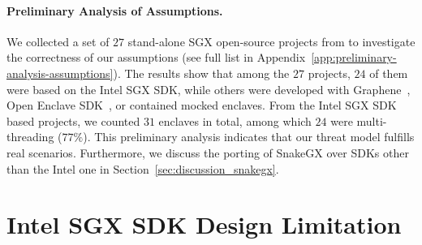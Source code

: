 \paragraph{Preliminary Analysis of Assumptions.}
We collected a set of $27$ stand-alone SGX open-source projects from 
\cite{asop} to investigate the correctness of our assumptions (see full 
list in Appendix~\ref{app:preliminary-analysis-assumptions}).
The results show that among the $27$ projects, $24$ of them were based on the 
Intel SGX SDK, while others were developed with Graphene~\citep{203255}, Open 
Enclave SDK~\citep{openenclave}, or contained mocked enclaves.
From the Intel SGX SDK based projects, we counted $31$ enclaves in total, 
among which $24$ were multi-threading ($77\%$).
This preliminary analysis indicates that our threat model fulfills 
real scenarios.
Furthermore, we discuss the porting of SnakeGX over SDKs other than the Intel 
one in Section~\ref{sec:discussion_snakegx}.

\section{Intel SGX SDK Design Limitation}
\label{sec:sgx-internal}



